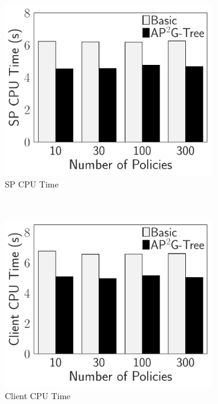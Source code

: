 \begin{figure}[t]
    \centering
    \begin{subfigure}{.33\linewidth}
        \includegraphics[width=\linewidth]{exp-figs/access-control/policy_1_sp.pdf}
        \caption{SP CPU Time}
    \end{subfigure}~%
    \begin{subfigure}{.33\linewidth}
        \includegraphics[width=\linewidth]{exp-figs/access-control/policy_1_user.pdf}
        \caption{Client CPU Time}
    \end{subfigure}~%
    \begin{subfigure}{.33\linewidth}

\end{subfigure}
\end{figure}
